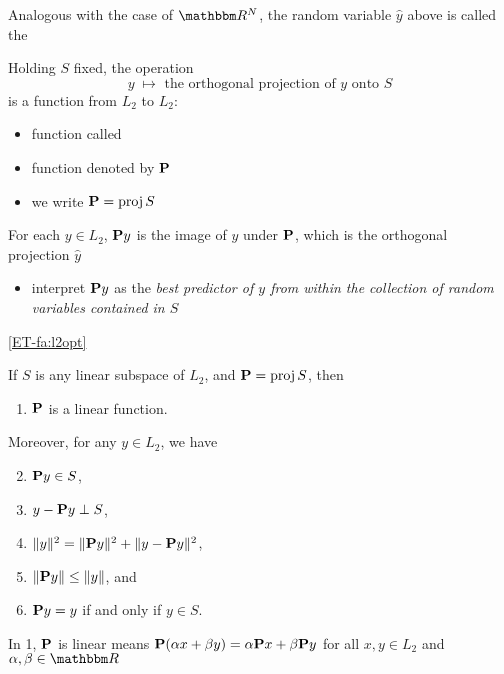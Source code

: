 \begin{frame}

    \vspace{2em}
    Analogous with the case of $\RR^N$, the random variable $\hat y$ above is 
    called the 
    
    Holding $S$ fixed, the operation 
    \begin{equation*}
        y \; \mapsto \text{ the orthogonal projection of $y$ onto } S
    \end{equation*}
    is a function from $L_2$ to $L_2$:

    \begin{itemize}
        \item function called 
        \item function denoted by $\mathbf P$ 
        \item we write $\mathbf P = \operatorname{proj} S$
    \end{itemize}
    
\end{frame}

\begin{frame}
    
    \vspace{2em}
    For each $y \in L_2$, $\mathbf P y$ is the image of $y$ under
    $\mathbf P$, which is the orthogonal projection $\hat y$
    \begin{itemize}
        \item interpret $\mathbf P y$ as the \emph{best predictor of $y$ from within 
        the collection of random variables contained in $S$}
    \end{itemize}
    
\end{frame}

\begin{frame}

    \vspace{2em}
    \Fact\eqref{ET-fa:l2opt}

    If $S$ is any linear subspace of $L_2$, and $\mathbf P = \operatorname{proj} S$, then
    \begin{enumerate}
        \item $\mathbf P$ is a linear function.
    \end{enumerate}
    Moreover, for any $y \in L_2$, we have
    \begin{enumerate}
        \setcounter{enumi}{1}
        \item $\mathbf P y \in S$,
        \item $y - \mathbf P y \perp S$,
        \item $\| y \|^2 = \| \mathbf P y \|^2 + \| y - \mathbf P
            y \|^2$,
        \item $\| \mathbf P y \| \leq \| y \|$, and
        \item $\mathbf P y = y$ if and only if $y \in S$.
    \end{enumerate}
    In 1, $\mathbf P$ is linear means $\mathbf P(\alpha x + \beta y) =
    \alpha \mathbf P x + \beta \mathbf P y$ for all $x, y \in L_2$  and $\alpha,\beta
    \in \RR$
    
\end{frame}

